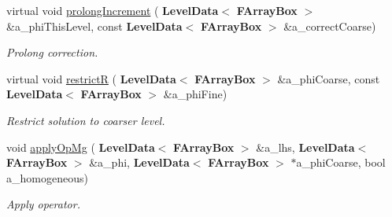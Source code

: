 \begin{Indent}
\begin{DoxyCompactItemize}
\mbox{\label{class_a_m_r_non_linear_multi_comp_op_a47ff0ed449857310593c55c4d192a581}} 
virtual void \hyperlink{class_a_m_r_non_linear_multi_comp_op_a47ff0ed449857310593c55c4d192a581}{prolong\+Increment} (\textbf{ Level\+Data}$<$ \textbf{ F\+Array\+Box} $>$ \&a\+\_\+phi\+This\+Level, const \textbf{ Level\+Data}$<$ \textbf{ F\+Array\+Box} $>$ \&a\+\_\+correct\+Coarse)
\begin{DoxyCompactList}\small\item\em Prolong correction. \end{DoxyCompactList}\item 
\mbox{\label{class_a_m_r_non_linear_multi_comp_op_a06ecad64d257df357ea7085974645b1d}} 
virtual void \hyperlink{class_a_m_r_non_linear_multi_comp_op_a06ecad64d257df357ea7085974645b1d}{restrictR} (\textbf{ Level\+Data}$<$ \textbf{ F\+Array\+Box} $>$ \&a\+\_\+phi\+Coarse, const \textbf{ Level\+Data}$<$ \textbf{ F\+Array\+Box} $>$ \&a\+\_\+phi\+Fine)
\begin{DoxyCompactList}\small\item\em Restrict solution to coarser level. \end{DoxyCompactList}\item 
\mbox{\label{class_a_m_r_non_linear_multi_comp_op_aee81544614b579b9ca7cb03c6e92f9cd}} 
void \hyperlink{class_a_m_r_non_linear_multi_comp_op_aee81544614b579b9ca7cb03c6e92f9cd}{apply\+Op\+Mg} (\textbf{ Level\+Data}$<$ \textbf{ F\+Array\+Box} $>$ \&a\+\_\+lhs, \textbf{ Level\+Data}$<$ \textbf{ F\+Array\+Box} $>$ \&a\+\_\+phi, \textbf{ Level\+Data}$<$ \textbf{ F\+Array\+Box} $>$ $\ast$a\+\_\+phi\+Coarse, bool a\+\_\+homogeneous)
\begin{DoxyCompactList}\small\item\em Apply operator. \end{DoxyCompactList}\end{DoxyCompactItemize}
\end{Indent}
